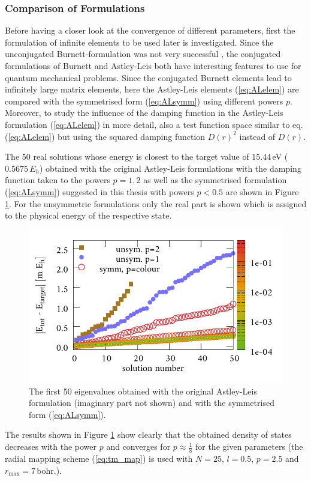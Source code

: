 \subsubsection{Comparison of Formulations}
\label{ch:bmFormul}
Before having a closer look at the convergence of different parameters, first the formulation of infinite elements to be used later is investigated.
Since the unconjugated Burnett-formulation was not very successful \cite{dreyer}, the conjugated formulations of Burnett and Astley-Leis both have interesting features to use for quantum mechanical problems.
Since the conjugated Burnett elements lead to infinitely large matrix elements, here the Astley-Leis elements (\ref{eq:ALelem}) are compared with the symmetrised form (\ref{eq:ALsymm}) using different powers $p$.
Moreover, to study the influence of the damping function in the Astley-Leis formulation (\ref{eq:ALelem}) in more detail, also a test function space similar to eq. (\ref{eq:ALelem}) but using the squared damping function $D(r)^2$ instead of $D(r)$.

The 50 real solutions whose energy is closest to the target value of $15.44\,$eV ($0.5675\,E_h$) obtained with the original Astley-Leis formulations with the damping function taken to the powers $p=1,2$ as well as the symmetrised formulation (\ref{eq:ALsymm}) suggested in this thesis with powers $p<0.5$ are shown in Figure \ref{fig:IFEMform_spect}.
For the unsymmetric formulations only the real part is shown which is assigned to the physical energy of the respective state.
\begin{figure}
\includegraphics[width=\textwidth]{Figures/IFem_form_spectra}
\caption{The first 50 eigenvalues obtained with the original Astley-Leis formulation (imaginary part not shown) and with the symmetrised form (\ref{eq:ALsymm}).}
\label{fig:IFEMform_spect}
\end{figure}
The results shown in Figure \ref{fig:IFEMform_spect} show clearly that the obtained density of states decreases with the power $p$ and converges for $p\approx \frac 18$ for the given parameters (the radial mapping scheme (\ref{eq:tm_map}) is used with $N=25$, $l=0.5$, $p=2.5$ and $r_\text{max}=7\,$bohr.).

